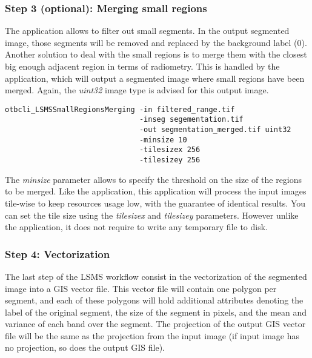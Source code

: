 \subsubsection{Step 3 (optional): Merging small regions}

The  application allows to filter out
small segments. In the output segmented image, those segments will be
removed and replaced by the background label (0). Another solution to
deal with the small regions is to merge them with the closest big
enough adjacent region in terms of radiometry. This is handled by the
 application, which will output a
segmented image where small regions have been merged. Again, the
\emph{uint32} image type is advised for this output image.

\begin{verbatim}
otbcli_LSMSSmallRegionsMerging -in filtered_range.tif
                               -inseg segementation.tif
                               -out segmentation_merged.tif uint32 
                               -minsize 10 
                               -tilesizex 256 
                               -tilesizey 256
\end{verbatim}

The \emph{minsize} parameter allows to specify the threshold on the
size of the regions to be merged. Like the 
application, this application will process the input images tile-wise
to keep resources usage low, with the guarantee of identical
results. You can set the tile size using the \emph{tilesizex} and
\emph{tilesizey} parameters. However unlike the
 application, it does not require to
write any temporary file to disk.

\subsubsection{Step 4: Vectorization}

The last step of the LSMS workflow consist in the vectorization of the
segmented image into a GIS vector file. This vector file will contain
one polygon per segment, and each of these polygons will hold
additional attributes denoting the label of the original segment, the
size of the segment in pixels, and the mean and variance of each band
over the segment. The projection of the output GIS vector file will be
the same as the projection from the input image (if input image has no
projection, so does the output GIS file).

